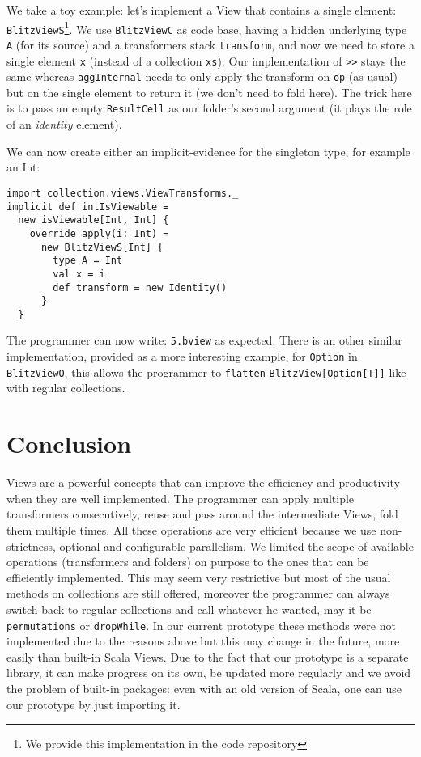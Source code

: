 \documentclass[a4paper,12pt,twocolumn]{article}
\begin{document}
We take a toy example: let's implement a View that contains a single element: \verb|BlitzViewS|\footnote{We provide this implementation in the code repository}.
We use \verb|BlitzViewC| as code base, having a hidden underlying type \verb|A| (for its source) and a transformers stack \verb|transform|, and now we need to store a single element \verb|x| (instead of a collection \verb|xs|).
Our implementation of \verb|>>| stays the same whereas \verb|aggInternal| needs to only apply the transform on \verb|op| (as usual) but on the single element to return it (we don't need to fold here).
The trick here is to pass an empty \verb|ResultCell| as our folder's second argument (it plays the role of an {\it identity}\/ element).

We can now create either an implicit-evidence for the singleton type, for example an Int:
\begin{lstlisting}
import collection.views.ViewTransforms._
implicit def intIsViewable =
  new isViewable[Int, Int] {
    override apply(i: Int) =
      new BlitzViewS[Int] {
        type A = Int
        val x = i
        def transform = new Identity()
      }
  }
\end{lstlisting}
The programmer can now write: \verb|5.bview| as expected.
There is an other similar implementation, provided as a more interesting example, for \verb|Option| in \verb|BlitzViewO|, this allows the programmer to \verb|flatten| \verb|BlitzView[Option[T]]| like with regular collections.

\section{Conclusion}
Views are a powerful concepts that can improve the efficiency and productivity when they are well implemented.
The programmer can apply multiple transformers consecutively, reuse and pass around the intermediate Views, fold them multiple times.
All these operations are very efficient because we use non-strictness, optional and configurable parallelism.
We limited the scope of available operations (transformers and folders) on purpose to the ones that can be efficiently implemented.
This may seem very restrictive but most of the usual methods on collections are still offered, moreover the programmer can always switch back to regular collections and call whatever he wanted, may it be \verb|permutations| or \verb|dropWhile|.
In our current prototype these methods were not implemented due to the reasons above but this may change in the future, more easily than built-in Scala Views.
Due to the fact that our prototype is a separate library, it can make progress on its own, be updated more regularly and we avoid the problem of built-in packages: even with an old version of Scala, one can use our prototype by just importing it.
\end{document}
